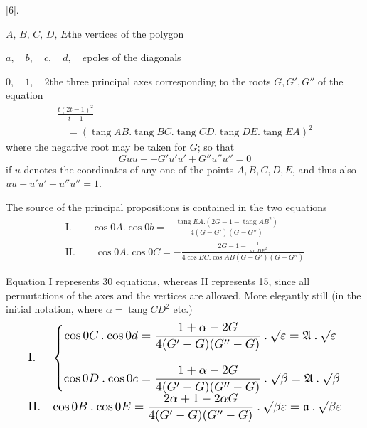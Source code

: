 \begingroup
\renewcommand{\arraystretch}{1.45}
\fancyhead[L]{}
\par\medskip{}\centerline{[6].}\nobreak\smallskip
\noindent\hspace*{2em}$A,\,B,\,C,\,D,\,E$\quad the vertices of the polygon\par
\noindent\hspace*{2em}$a,\quad b,\quad c,\quad d,\quad e$\quad poles of the diagonals\par
\noindent\hspace*{2em}$0,\quad1,\quad2$\quad the three principal axes corresponding to the roots
$G,G',G''$ of the equation
\[
\begin{gathered}\frac{t(2t-1)^2}{t-1}\\[9pt]\quad{}=(\operatorname{tang}AB\mathord{.}\operatorname{tang}BC\mathord{.}\operatorname{tang}CD\mathord{.}\operatorname{tang}DE\mathord{.}\operatorname{tang}EA)^2\end{gathered}
\]
where the negative root may be taken for $G$; so that
\[
Guu++G'u'u'+G''u''u''=0
\]
if $u$ denotes the coordinates of any one of the points $A,B,C,D,E$, and thus also $uu+u'u'+u''u''=1$.


The source of the principal propositions is contained in the two equations
\[
\begin{gathered} \text{I.}\qquad\cos0A\mathord{.}\cos0b=-\frac{\operatorname{tang}EA\mathord{.}(2G-1-\operatorname{tang}AB^2)}{4(G-G')(G-G'')}\\[9pt] \text{II.}\qquad\cos0A\mathord{.}\cos0C=-\frac{2G-1-\frac{1}{\sin DE^2}}{4\cos BC\mathord{.}\cos AB(G-G')(G-G'')} \end{gathered}
\]



Equation I represents 30 equations, whereas II represents 15, since all permutations of the axes and the vertices are allowed. More elegantly still
(in the initial notation, where $\alpha=\operatorname{tang}CD^2$ etc.)
\begingroup\small\setlength{\arraycolsep}{3pt}\[
\resizebox{.95\linewidth}{!}{$\displaystyle \begin{array}{ll} \mathrm{I.}&\left\{\begin{aligned} \cos 0C\mathbin{.}\cos 0d&=\frac{1+\alpha-2G}{4(G'-G)(G''-G)}\mathbin{.}\surd\varepsilon=\mathfrak{A}\mathbin{.}\surd\varepsilon\\[9pt] \cos 0D\mathbin{.}\cos 0c&=\frac{1+\alpha-2G}{4(G'-G)(G''-G)}\mathbin{.}\surd\beta=\mathfrak{A}\mathbin{.}\surd\beta \end{aligned}\right.\\[18pt] \mathrm{II.}&\displaystyle \cos 0B\mathbin{.}\cos 0E=\frac{2\alpha+1-2\alpha G}{4(G'-G)(G''-G)}\mathbin{.}\surd\beta\varepsilon=\mathfrak{a}\mathbin{.}\surd\beta\varepsilon \end{array}$}
\]\endgroup

